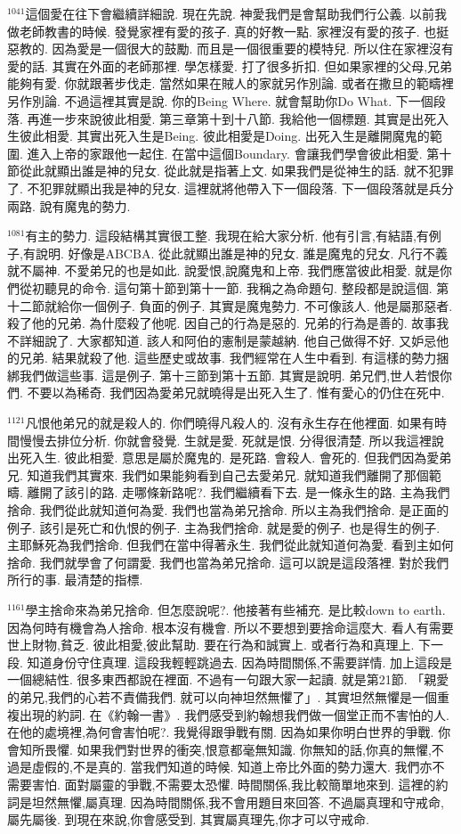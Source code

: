 \documentclass{book}
\begin{document}
$^{1041}$這個愛在往下會繼續詳細說.
現在先說.
神愛我們是會幫助我們行公義.
以前我做老師教書的時候.
發覺家裡有愛的孩子.
真的好教一點.
家裡沒有愛的孩子.
也挺惡教的.
因為愛是一個很大的鼓勵.
而且是一個很重要的模特兒.
所以住在家裡沒有愛的話.
其實在外面的老師那裡.
學怎樣愛.
打了很多折扣.
但如果家裡的父母,兄弟能夠有愛.
你就跟著步伐走.
當然如果在賊人的家就另作別論.
或者在撒旦的範疇裡另作別論.
不過這裡其實是說.
你的Being Where.
就會幫助你Do What.
下一個段落.
再進一步來說彼此相愛.
第三章第十到十八節.
我給他一個標題.
其實是出死入生彼此相愛.
其實出死入生是Being.
彼此相愛是Doing.
出死入生是離開魔鬼的範圍.
進入上帝的家跟他一起住.
在當中這個Boundary.
會讓我們學會彼此相愛.
第十節從此就顯出誰是神的兒女.
從此就是指著上文.
如果我們是從神生的話.
就不犯罪了.
不犯罪就顯出我是神的兒女.
這裡就將他帶入下一個段落.
下一個段落就是兵分兩路.
說有魔鬼的勢力.

$^{1081}$有主的勢力.
這段結構其實很工整.
我現在給大家分析.
他有引言,有結語,有例子,有說明.
好像是ABCBA.
從此就顯出誰是神的兒女.
誰是魔鬼的兒女.
凡行不義就不屬神.
不愛弟兄的也是如此.
說愛恨,說魔鬼和上帝.
我們應當彼此相愛.
就是你們從初聽見的命令.
這句第十節到第十一節.
我稱之為命題句.
整段都是說這個.
第十二節就給你一個例子.
負面的例子.
其實是魔鬼勢力.
不可像該人.
他是屬那惡者.
殺了他的兄弟.
為什麼殺了他呢.
因自己的行為是惡的.
兄弟的行為是善的.
故事我不詳細說了.
大家都知道.
該人和阿伯的憲制是蒙越納.
他自己做得不好.
又妒忌他的兄弟.
結果就殺了他.
這些歷史或故事.
我們經常在人生中看到.
有這樣的勢力捆綁我們做這些事.
這是例子.
第十三節到第十五節.
其實是說明.
弟兄們,世人若恨你們.
不要以為稀奇.
我們因為愛弟兄就曉得是出死入生了.
惟有愛心的仍住在死中.

$^{1121}$凡恨他弟兄的就是殺人的.
你們曉得凡殺人的.
沒有永生存在他裡面.
如果有時間慢慢去排位分析.
你就會發覺.
生就是愛.
死就是恨.
分得很清楚.
所以我這裡說出死入生.
彼此相愛.
意思是屬於魔鬼的.
是死路.
會殺人.
會死的.
但我們因為愛弟兄.
知道我們其實來.
我們如果能夠看到自己去愛弟兄.
就知道我們離開了那個範疇.
離開了該引的路.
走哪條新路呢?.
我們繼續看下去.
是一條永生的路.
主為我們捨命.
我們從此就知道何為愛.
我們也當為弟兄捨命.
所以主為我們捨命.
是正面的例子.
該引是死亡和仇恨的例子.
主為我們捨命.
就是愛的例子.
也是得生的例子.
主耶穌死為我們捨命.
但我們在當中得著永生.
我們從此就知道何為愛.
看到主如何捨命.
我們就學會了何謂愛.
我們也當為弟兄捨命.
這可以說是這段落裡.
對於我們所行的事.
最清楚的指標.

$^{1161}$學主捨命來為弟兄捨命.
但怎麼說呢?.
他接著有些補充.
是比較down to earth.
因為何時有機會為人捨命.
根本沒有機會.
所以不要想到要捨命這麼大.
看人有需要世上財物,貧乏.
彼此相愛,彼此幫助.
要在行為和誠實上.
或者行為和真理上.
下一段.
知道身份守住真理.
這段我輕輕跳過去.
因為時間關係,不需要詳情.
加上這段是一個總結性.
很多東西都說在裡面.
不過有一句跟大家一起讀.
就是第21節.
「親愛的弟兄,我們的心若不責備我們.
就可以向神坦然無懼了」.
其實坦然無懼是一個重複出現的約詞.
在《約翰一書》.
我們感受到約翰想我們做一個堂正而不害怕的人.
在他的處境裡,為何會害怕呢?.
我覺得跟爭戰有關.
因為如果你明白世界的爭戰.
你會知所畏懼.
如果我們對世界的衝突,恨意都毫無知識.
你無知的話,你真的無懼,不過是虛假的,不是真的.
當我們知道的時候.
知道上帝比外面的勢力還大.
我們亦不需要害怕.
面對屬靈的爭戰,不需要太恐懼.
時間關係,我比較簡單地來到.
這裡的約詞是坦然無懼,屬真理.
因為時間關係,我不會用題目來回答.
不過屬真理和守戒命,屬先屬後.
到現在來說,你會感受到.
其實屬真理先,你才可以守戒命.
\end{document}
